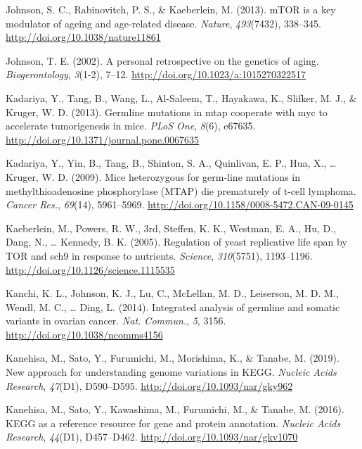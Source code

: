 \documentclass[12pt,twoside]{unicam}
\begin{document}
\begin{cslreferences}
\leavevmode\hypertarget{ref-Johnson2013}{}%
Johnson, S. C., Rabinovitch, P. S., \& Kaeberlein, M. (2013). mTOR is a key modulator of ageing and age-related disease. \emph{Nature}, \emph{493}(7432), 338--345. \url{http://doi.org/10.1038/nature11861}

\leavevmode\hypertarget{ref-Johnson2002}{}%
Johnson, T. E. (2002). A personal retrospective on the genetics of aging. \emph{Biogerontology}, \emph{3}(1-2), 7--12. \url{http://doi.org/10.1023/a:1015270322517}

\leavevmode\hypertarget{ref-Kadariya2013}{}%
Kadariya, Y., Tang, B., Wang, L., Al-Saleem, T., Hayakawa, K., Slifker, M. J., \& Kruger, W. D. (2013). Germline mutations in mtap cooperate with myc to accelerate tumorigenesis in mice. \emph{PLoS One}, \emph{8}(6), e67635. \url{http://doi.org/10.1371/journal.pone.0067635}

\leavevmode\hypertarget{ref-Kadariya2009}{}%
Kadariya, Y., Yin, B., Tang, B., Shinton, S. A., Quinlivan, E. P., Hua, X., \ldots{} Kruger, W. D. (2009). Mice heterozygous for germ-line mutations in methylthioadenosine phosphorylase (MTAP) die prematurely of t-cell lymphoma. \emph{Cancer Res.}, \emph{69}(14), 5961--5969. \url{http://doi.org/10.1158/0008-5472.CAN-09-0145}

\leavevmode\hypertarget{ref-Kaeberlein2005}{}%
Kaeberlein, M., Powers, R. W., 3rd, Steffen, K. K., Westman, E. A., Hu, D., Dang, N., \ldots{} Kennedy, B. K. (2005). Regulation of yeast replicative life span by TOR and sch9 in response to nutrients. \emph{Science}, \emph{310}(5751), 1193--1196. \url{http://doi.org/10.1126/science.1115535}

\leavevmode\hypertarget{ref-Kanchi2014}{}%
Kanchi, K. L., Johnson, K. J., Lu, C., McLellan, M. D., Leiserson, M. D. M., Wendl, M. C., \ldots{} Ding, L. (2014). Integrated analysis of germline and somatic variants in ovarian cancer. \emph{Nat. Commun.}, \emph{5}, 3156. \url{http://doi.org/10.1038/ncomms4156}

\leavevmode\hypertarget{ref-Kanehisa2019}{}%
Kanehisa, M., Sato, Y., Furumichi, M., Morishima, K., \& Tanabe, M. (2019). New approach for understanding genome variations in KEGG. \emph{Nucleic Acids Research}, \emph{47}(D1), D590--D595. \url{http://doi.org/10.1093/nar/gky962}

\leavevmode\hypertarget{ref-Kanehisa2016}{}%
Kanehisa, M., Sato, Y., Kawashima, M., Furumichi, M., \& Tanabe, M. (2016). KEGG as a reference resource for gene and protein annotation. \emph{Nucleic Acids Research}, \emph{44}(D1), D457--D462. \url{http://doi.org/10.1093/nar/gkv1070}


\end{cslreferences}
\end{document}
